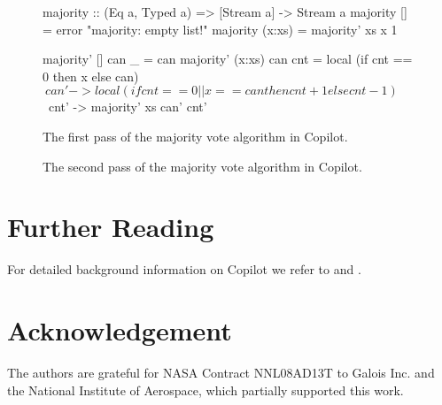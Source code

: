 \documentclass[]{article}
\theoremstyle{example}
\begin{document}
\begin{figure}
\begin{code}
majority :: (Eq a, Typed a) => [Stream a] -> Stream a
majority []     = error "majority: empty list!"
majority (x:xs) = majority' xs x 1

majority' []     can _   = can
majority' (x:xs) can cnt =
  local
    (if cnt == 0 then x else can) $
      \ can' ->
        local (if cnt == 0 || x == can then cnt+1 else cnt-1) $
          \ cnt' ->
            majority' xs can' cnt'
\end{code}
\caption{The first pass of the majority vote algorithm in Copilot.}
\label{fig:majority}
\end{figure}

\begin{figure}
\caption{The second pass of the majority vote algorithm in Copilot.}
\label{fig:amajority}
\end{figure}



\section*{Further Reading}

For detailed background information on Copilot we refer to \cite{PikeGoodloe2010} and \cite{PikeGoodloe2011}.

\section*{Acknowledgement}

The authors are grateful for NASA Contract NNL08AD13T to Galois Inc. and the
National Institute of Aerospace, which partially supported this work.

{


}
\end{document}
